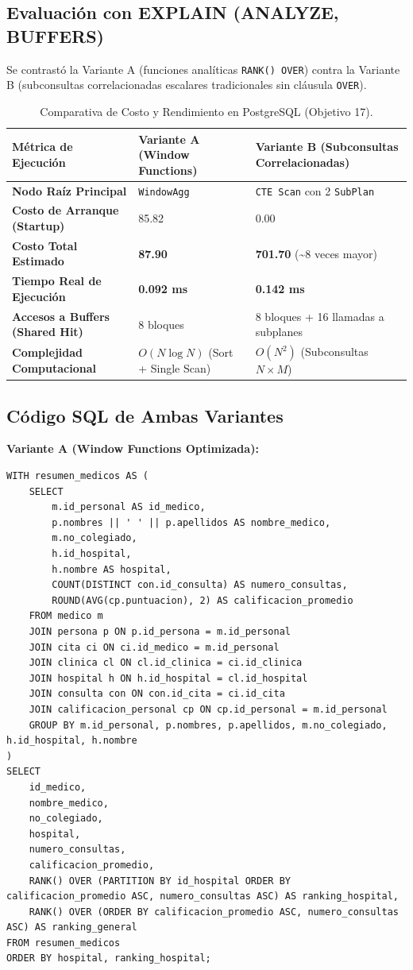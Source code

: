 \documentclass[11pt,a4paper]{article}
\begin{document}
\subsection{Evaluación con EXPLAIN (ANALYZE, BUFFERS)}
Se contrastó la Variante A (funciones analíticas \texttt{RANK() OVER}) contra la Variante B (subconsultas correlacionadas escalares tradicionales sin cláusula \texttt{OVER}).

\begin{table}[H]
\centering
\small
\begin{tabularx}{\linewidth}{|l|X|X|}
\hline
\textbf{Métrica de Ejecución} & \textbf{Variante A (Window Functions)} & \textbf{Variante B (Subconsultas Correlacionadas)} \\
\hline
\textbf{Nodo Raíz Principal} & \texttt{WindowAgg} & \texttt{CTE Scan} con 2 \texttt{SubPlan} \\
\textbf{Costo de Arranque (Startup)} & 85.82 & 0.00 \\
\textbf{Costo Total Estimado} & \textbf{87.90} & \textbf{701.70} (\textasciitilde{}8 veces mayor) \\
\textbf{Tiempo Real de Ejecución} & \textbf{0.092 ms} & \textbf{0.142 ms} \\
\textbf{Accesos a Buffers (Shared Hit)} & 8 bloques & 8 bloques + 16 llamadas a subplanes \\
\textbf{Complejidad Computacional} & $O(N \log N)$ (Sort + Single Scan) & $O(N^2)$ (Subconsultas $N \times M$) \\
\hline
\end{tabularx}
\caption{Comparativa de Costo y Rendimiento en PostgreSQL (Objetivo 17).}
\end{table}

\subsection{Código SQL de Ambas Variantes}
\textbf{Variante A (Window Functions Optimizada):}
\begin{lstlisting}[style=sqlstyle]
WITH resumen_medicos AS (
    SELECT 
        m.id_personal AS id_medico,
        p.nombres || ' ' || p.apellidos AS nombre_medico,
        m.no_colegiado,
        h.id_hospital,
        h.nombre AS hospital,
        COUNT(DISTINCT con.id_consulta) AS numero_consultas,
        ROUND(AVG(cp.puntuacion), 2) AS calificacion_promedio
    FROM medico m
    JOIN persona p ON p.id_persona = m.id_personal
    JOIN cita ci ON ci.id_medico = m.id_personal
    JOIN clinica cl ON cl.id_clinica = ci.id_clinica
    JOIN hospital h ON h.id_hospital = cl.id_hospital
    JOIN consulta con ON con.id_cita = ci.id_cita
    JOIN calificacion_personal cp ON cp.id_personal = m.id_personal
    GROUP BY m.id_personal, p.nombres, p.apellidos, m.no_colegiado, h.id_hospital, h.nombre
)
SELECT 
    id_medico,
    nombre_medico,
    no_colegiado,
    hospital,
    numero_consultas,
    calificacion_promedio,
    RANK() OVER (PARTITION BY id_hospital ORDER BY calificacion_promedio ASC, numero_consultas ASC) AS ranking_hospital,
    RANK() OVER (ORDER BY calificacion_promedio ASC, numero_consultas ASC) AS ranking_general
FROM resumen_medicos
ORDER BY hospital, ranking_hospital;
\end{lstlisting}
\end{document}
